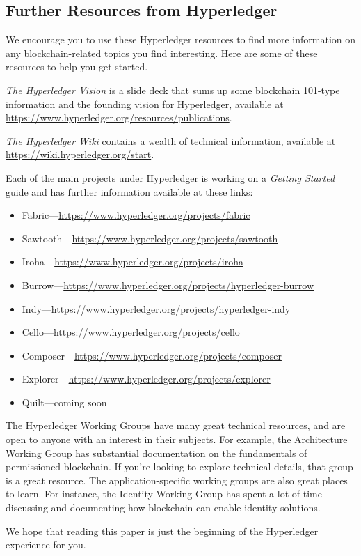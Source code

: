 \subsection{Further Resources from Hyperledger}
We encourage you to use these Hyperledger resources to find more information on any blockchain-related topics you find interesting. Here are some of these resources to help you get started. 

\emph{The Hyperledger Vision} is a slide deck that sums up some blockchain 101-type information and the founding vision for Hyperledger, available at \url{https://www.hyperledger.org/resources/publications}. 
 
\emph{The Hyperledger Wiki} contains a wealth of technical information, available at \url{https://wiki.hyperledger.org/start}.

Each of the main projects under Hyperledger is working on a \emph{Getting Started} guide and has further information available at these links:
\begin{itemize}
\item Fabric---\url{https://www.hyperledger.org/projects/fabric}
\item Sawtooth---\url{https://www.hyperledger.org/projects/sawtooth}
\item Iroha---\url{https://www.hyperledger.org/projects/iroha}
\item Burrow---\url{https://www.hyperledger.org/projects/hyperledger-burrow}
\item Indy---\url{https://www.hyperledger.org/projects/hyperledger-indy}
\item Cello---\url{https://www.hyperledger.org/projects/cello}
\item Composer---\url{https://www.hyperledger.org/projects/composer}
\item Explorer---\url{https://www.hyperledger.org/projects/explorer}
\item Quilt---coming soon \url{}
\end{itemize} 

The Hyperledger Working Groups have many great technical resources, and are open to anyone with an interest in their subjects. For example, the Architecture Working Group has substantial documentation on the fundamentals of permissioned blockchain. If you're looking to explore technical details, that group is a great resource. The application-specific working groups are also great places to learn. For instance, the Identity Working Group has spent a lot of time discussing and documenting how blockchain can enable identity solutions. 

We hope that reading this paper is just the beginning of the Hyperledger experience for you. 
